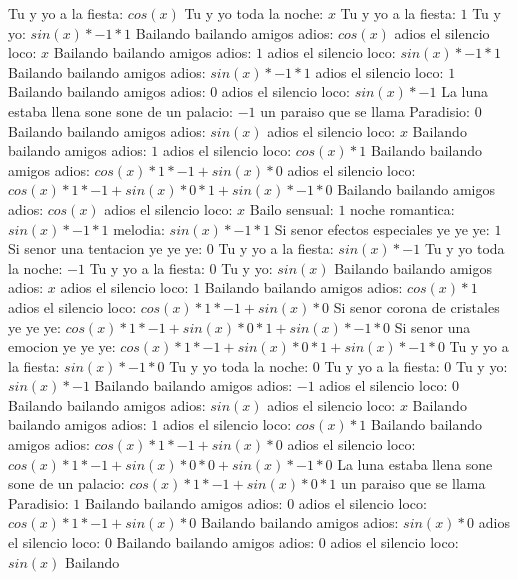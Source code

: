 \documentclass{article}
\begin{document}
Tu y yo a la fiesta: $cos(x)$  \newline Tu y yo toda la noche: $x$ Tu y yo a la fiesta: $1$  \newline Tu y yo: $sin(x)*-1*1$ Bailando bailando amigos adios: $cos(x)$  \newline adios el silencio loco: $x$ Bailando bailando amigos adios: $1$  \newline adios el silencio loco: $sin(x)*-1*1$ Bailando bailando amigos adios: $sin(x)*-1*1$ adios el silencio loco: $1$ Bailando bailando amigos adios: $0$  \newline adios el silencio loco: $sin(x)*-1$ La luna estaba llena sone sone de un palacio: $-1$ un paraiso que se llama Paradisio: $0$  \newline Bailando bailando amigos adios: $sin(x)$  \newline adios el silencio loco: $x$ Bailando bailando amigos adios: $1$  \newline adios el silencio loco: $cos(x)*1$ Bailando bailando amigos adios: $cos(x)*1*-1+sin(x)*0$ adios el silencio loco: ${cos(x)*1*-1+sin(x)*0}*1+sin(x)*-1*0$ Bailando bailando amigos adios: $cos(x)$  \newline adios el silencio loco: $x$ Bailo sensual: $1$  \newline noche romantica: $sin(x)*-1*1$ melodia: $sin(x)*-1*1$ Si senor efectos especiales ye ye ye: $1$ Si senor una tentacion ye ye ye: $0$  \newline Tu y yo a la fiesta: $sin(x)*-1$ Tu y yo toda la noche: $-1$ Tu y yo a la fiesta: $0$  \newline Tu y yo: $sin(x)$  \newline Bailando bailando amigos adios: $x$ adios el silencio loco: $1$  \newline Bailando bailando amigos adios: $cos(x)*1$ adios el silencio loco: $cos(x)*1*-1+sin(x)*0$ Si senor corona de cristales ye ye ye: ${cos(x)*1*-1+sin(x)*0}*1+sin(x)*-1*0$ Si senor una emocion ye ye ye: ${cos(x)*1*-1+sin(x)*0}*1+sin(x)*-1*0$  \newline Tu y yo a la fiesta: $sin(x)*-1*0$ Tu y yo toda la noche: $0$ Tu y yo a la fiesta: $0$  \newline Tu y yo: $sin(x)*-1$ Bailando bailando amigos adios: $-1$ adios el silencio loco: $0$  \newline Bailando bailando amigos adios: $sin(x)$  \newline adios el silencio loco: $x$ Bailando bailando amigos adios: $1$  \newline adios el silencio loco: $cos(x)*1$ Bailando bailando amigos adios: $cos(x)*1*-1+sin(x)*0$ adios el silencio loco: ${cos(x)*1*-1+sin(x)*0}*0+sin(x)*-1*0$ La luna estaba llena sone sone de un palacio: ${cos(x)*1*-1+sin(x)*0}*1$ un paraiso que se llama Paradisio: $1$ Bailando bailando amigos adios: $0$  \newline adios el silencio loco: $cos(x)*1*-1+sin(x)*0$  \newline Bailando bailando amigos adios: $sin(x)*0$ adios el silencio loco: $0$ Bailando bailando amigos adios: $0$  \newline adios el silencio loco: $sin(x)$  \newline Bailando 
\end{document}
